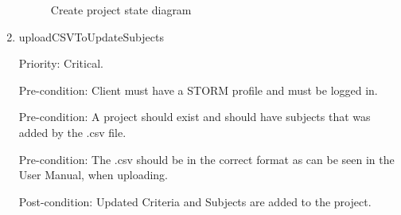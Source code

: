 \begin{enumerate}
\begin{figure}[H]
    \caption{Create project state diagram}
\end{figure}
\item uploadCSVToUpdateSubjects\par
Priority: Critical.\par
Pre-condition: Client must have a STORM profile and must be logged in.\par
Pre-condition: A project should exist and should have subjects that was added by the .csv file.\par
Pre-condition: The .csv should be in the correct format as can be seen in the User Manual, when uploading.\par
Post-condition: Updated Criteria and Subjects are added to the project.\par
\end{enumerate}

